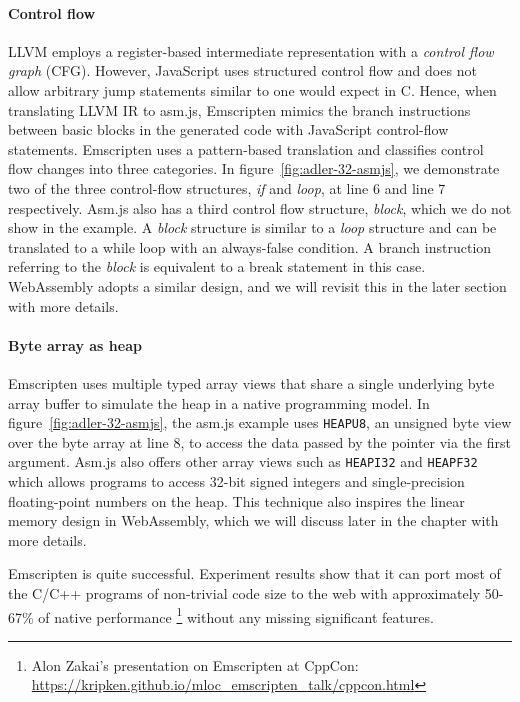 \paragraph{Control flow}
LLVM employs a register-based intermediate representation with a
\emph{control flow graph} (CFG). However, JavaScript uses structured control
flow and does not allow arbitrary jump statements similar to one would expect
in C. Hence, when translating LLVM IR to asm.js, Emscripten mimics the branch
instructions between basic blocks in the generated code with JavaScript
control-flow statements. Emscripten uses a pattern-based translation and
classifies control flow changes into three categories.
In figure~\ref{fig:adler-32-asmjs}, we demonstrate two of the three
control-flow structures, \emph{if} and \emph{loop}, at line $6$ and line $7$
respectively. Asm.js also has a third control flow structure, \emph{block},
which we do not show in the example. A \emph{block} structure is similar to a
\emph{loop} structure and can be translated to a while loop with an always-false
condition. A branch instruction referring to the \emph{block} is equivalent
to a break statement in this case. WebAssembly adopts a similar design, and we
will revisit this in the later section with more details.

\paragraph{Byte array as heap}
Emscripten uses multiple typed array views that share a single underlying byte
array buffer to simulate the heap in a native programming model.
In figure~\ref{fig:adler-32-asmjs}, the asm.js example uses \texttt{HEAPU8}, an
unsigned byte view over the byte array at line $8$, to access the data passed by
the pointer via the first argument. Asm.js also offers other array views such
as \texttt{HEAPI32} and \texttt{HEAPF32} which allows programs to access 32-bit
signed integers and single-precision floating-point numbers on the heap. This
technique also inspires the linear memory design in WebAssembly, which we will
discuss later in the chapter with more details.

Emscripten is quite successful. Experiment results show that it can port most of
the C/C++ programs of non-trivial code size to the web with approximately
50-67\% of native performance
\footnote{Alon Zakai's presentation on Emscripten at CppCon:
  \\\url{https://kripken.github.io/mloc_emscripten_talk/cppcon.html}}
without any missing significant features.

